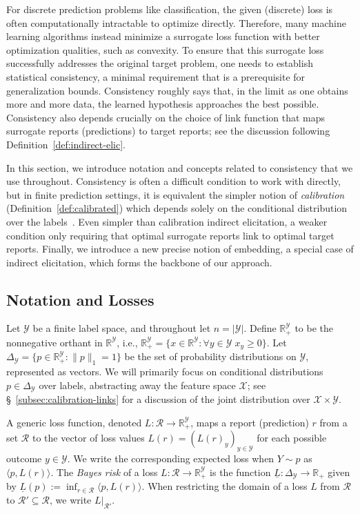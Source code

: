 \documentclass[twoside,11pt]{article}
\newcommand{\reals}{\mathbb{R}}
\newcommand{\simplex}{\Delta_\Y}
\newcommand{\R}{\mathcal{R}}
\newcommand{\X}{\mathcal{X}}
\newcommand{\Y}{\mathcal{Y}}
\newcommand{\risk}[1]{\underline{#1}}
\newcommand{\inprod}[2]{\langle #1, #2 \rangle}%
\begin{document}
For discrete prediction problems like classification, the given (discrete) loss is often computationally intractable to optimize directly.
Therefore, many machine learning algorithms instead minimize a surrogate loss function with better optimization qualities, such as convexity.
To ensure that this surrogate loss successfully addresses the original target problem, one needs to establish statistical consistency, a minimal requirement that is a prerequisite for generalization bounds.
Consistency roughly says that, in the limit as one obtains more and more data, the learned hypothesis approaches the best possible.
Consistency also depends crucially on the choice of link function that maps surrogate reports (predictions) to target reports; see the discussion following Definition~\ref{def:indirect-elic}.

In this section, we introduce notation and concepts related to consistency that we use throughout.
Consistency is often a difficult condition to work with directly, but in finite prediction settings, it is equivalent the simpler notion of \emph{calibration} (Definition~\ref{def:calibrated}) which depends solely on the conditional distribution over the labels~\citep{bartlett2006convexity,tewari2007consistency,ramaswamy2016convex}.
Even simpler than calibration indirect elicitation, a weaker condition only requiring that optimal surrogate reports link to optimal target reports.
Finally, we introduce a new precise notion of embedding, a special case of indirect elicitation, which forms the backbone of our approach.


\subsection{Notation and Losses}
\label{sec:notation-losses}

Let $\Y$ be a finite label space, and throughout let $n=|\Y|$.
Define $\reals^\Y_+$ to be the nonnegative orthant in $\reals^\Y$, i.e., $\reals^\Y_+ = \{x \in \reals^\Y : \forall y\in\Y\; x_y \geq 0 \}$.
Let $\simplex = \{p\in\reals^{\Y}_+ : \|p\|_1 = 1\}$ be the set of probability distributions on $\Y$, represented as vectors.
We will primarily focus on conditional distributions $p\in\simplex$ over labels, abstracting away the feature space $\X$; see \S~\ref{subsec:calibration-links} for a discussion of the joint distribution over $\X\times\Y$.

A generic loss function, denoted $L:\R\to\reals^\Y_+$, maps a report (prediction) $r$ from a set $\R$ to the vector of loss values $L(r) = (L(r)_y)_{y\in\Y}$ for each possible outcome $y\in\Y$.
We write the corresponding expected loss when $Y \sim p$ as $\inprod{p}{L(r)}$.
The \emph{Bayes risk} of a loss $L:\R\to\reals^\Y_+$ is the function $\risk{L}:\simplex\to\reals_+$ given by $\risk{L}(p) := \inf_{r\in\R} \inprod{p}{L(r)}$.
When restricting the domain of a loss $L$ from $\R$ to $\R' \subseteq \R$, we write $L|_{\R'}$.
\end{document}
